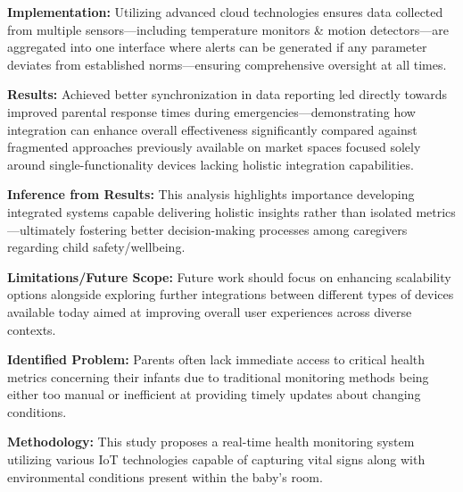 \documentclass[12pt,a4paper]{report}
\begin{document}
\noindent\textbf{Implementation:} Utilizing advanced cloud technologies ensures data collected from multiple sensors—including temperature monitors \& motion detectors—are aggregated into one interface where alerts can be generated if any parameter deviates from established norms—ensuring comprehensive oversight at all times.
\setlength{\parskip}{1em}  %

\noindent\textbf{Results:} Achieved better synchronization in data reporting led directly towards improved parental response times during emergencies—demonstrating how integration can enhance overall effectiveness significantly compared against fragmented approaches previously available on market spaces focused solely around single-functionality devices lacking holistic integration capabilities.

\setlength{\parskip}{1em}  %


\noindent\textbf{Inference from Results:} This analysis highlights importance developing integrated systems capable delivering holistic insights rather than isolated metrics—ultimately fostering better decision-making processes among caregivers regarding child safety/wellbeing.


\setlength{\parskip}{1em}  %

\noindent\textbf{Limitations/Future Scope:} Future work should focus on enhancing scalability options alongside exploring further integrations between different types of devices available today aimed at improving overall user experiences across diverse contexts.
\setlength{\parskip}{1em}  %

\noindent\textbf{Identified Problem:} Parents often lack immediate access to critical health metrics concerning their infants due to traditional monitoring methods being either too manual or inefficient at providing timely updates about changing conditions\cite{aktacs2016real}.

\setlength{\parskip}{1em}  %


\noindent\textbf{Methodology:} This study proposes a real-time health monitoring system utilizing various IoT technologies capable of capturing vital signs along with environmental conditions present within the baby's room.
\end{document}
